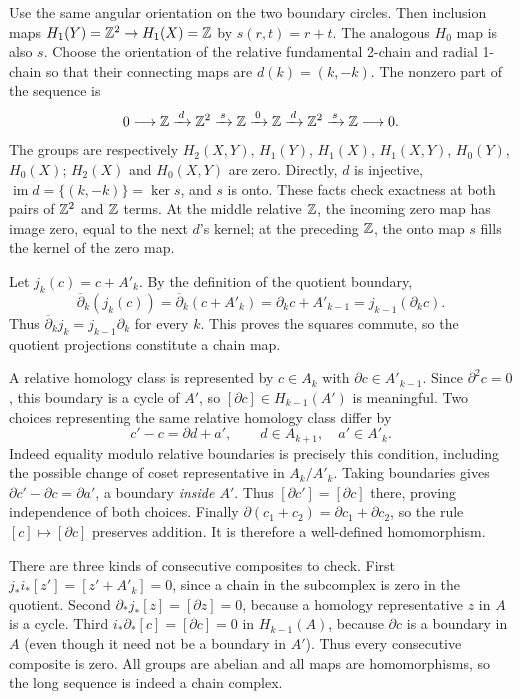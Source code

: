 Use the same angular orientation on the two boundary circles. Then inclusion maps $H_1(Y)=\mathbb{Z}^2\to H_1(X)=\mathbb{Z}$ by $s(r,t)=r+t$. The analogous $H_0$ map is also $s$.
Choose the orientation of the relative fundamental 2-chain and radial 1-chain so that their connecting maps are $d(k)=(k,-k)$.
The nonzero part of the sequence is
\[
0\longrightarrow\mathbb{Z}\xrightarrow{\,d\,}\mathbb{Z}^2
\xrightarrow{\,s\,}\mathbb{Z}\xrightarrow{\,0\,}\mathbb{Z}
\xrightarrow{\,d\,}\mathbb{Z}^2\xrightarrow{\,s\,}\mathbb{Z}\longrightarrow0.
\]
The groups are respectively $H_2(X,Y)$, $H_1(Y)$, $H_1(X)$, $H_1(X,Y)$, $H_0(Y)$, $H_0(X)$; $H_2(X)$ and $H_0(X,Y)$ are zero.
Directly, $d$ is injective, $\operatorname{im}d=\{(k,-k)\}=\ker s$, and $s$ is onto. These facts check exactness at both pairs of $\mathbb{Z}^2$ and $\mathbb{Z}$ terms. At the middle relative $\mathbb{Z}$, the incoming zero map has image zero, equal to the next $d$'s kernel; at the preceding $\mathbb{Z}$, the onto map $s$ fills the kernel of the zero map.

Let $j_k(c)=c+A'_k$. By the definition of the quotient boundary,
\[
\overline\partial_k(j_k(c))
=\overline\partial_k(c+A'_k)
=\partial_kc+A'_{k-1}
=j_{k-1}(\partial_kc).
\]
Thus $\overline\partial_kj_k=j_{k-1}\partial_k$ for every $k$. This proves the squares commute, so the quotient projections constitute a chain map.

A relative homology class is represented by $c\in A_k$ with $\partial c\in A'_{k-1}$. Since $\partial^2c=0$, this boundary is a cycle of $A'$, so $[\partial c]\in H_{k-1}(A')$ is meaningful.
Two choices representing the same relative homology class differ by
\[
c'-c=\partial d+a',\qquad d\in A_{k+1},\quad a'\in A'_k.
\]
Indeed equality modulo relative boundaries is precisely this condition, including the possible change of coset representative in $A_k/A'_k$.
Taking boundaries gives $\partial c'-\partial c=\partial a'$, a boundary \emph{inside $A'$}. Thus $[\partial c']=[\partial c]$ there, proving independence of both choices.
Finally $\partial(c_1+c_2)=\partial c_1+\partial c_2$, so the rule $[c]\mapsto[\partial c]$ preserves addition. It is therefore a well-defined homomorphism.

There are three kinds of consecutive composites to check.
First $j_*i_*[z']=[z'+A'_k]=0$, since a chain in the subcomplex is zero in the quotient.
Second $\partial_*j_*[z]=[\partial z]=0$, because a homology representative $z$ in $A$ is a cycle.
Third $i_*\partial_*[c]=[\partial c]=0$ in $H_{k-1}(A)$, because $\partial c$ is a boundary in $A$ (even though it need not be a boundary in $A'$).
Thus every consecutive composite is zero. All groups are abelian and all maps are homomorphisms, so the long sequence is indeed a chain complex.

